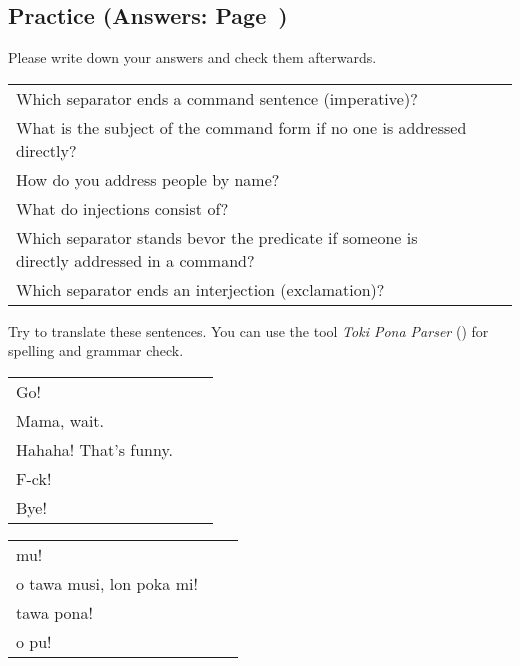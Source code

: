 \subsection*{Practice (Answers: Page~\pageref{'commands_interjections'})}
%
Please write down your answers and check them afterwards. 

\begin{supertabular}{p{5,5cm}|ll}
Which separator ends a command sentence (imperative)? &&  \\ %
What is the subject of the command form if no one is addressed directly? &&  \\ %
How do you address people by name? &&  \\ %
What do injections consist of? &&  \\ %
Which separator stands bevor  the predicate if someone is directly addressed in a command? &&  \\ %
Which separator ends an interjection (exclamation)? &&  \\ %
\end{supertabular}

Try to translate these sentences. 
You can use the tool \textit{Toki Pona Parser} (\cite{www:rowa:02}) for spelling and grammar check. 

\begin{supertabular}{p{5,5cm}|ll}
Go!  &&  \\ %
Mama, wait.  &&  \\ %
Hahaha! That's funny.  &&  \\ %
F-ck! &&  \\ %
Bye!  &&  \\ %
\end{supertabular}

\begin{supertabular}{p{5,5cm}|ll}
mu!  &&  \\ %
o tawa musi, lon poka mi!  &&  \\ %
tawa pona!  &&  \\ %
o pu! &&  \\ %
\end{supertabular} 

%
